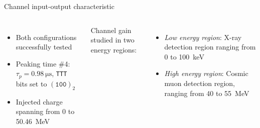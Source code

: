 \documentclass[aspectratio=169,xcolor=dvipsnames]{beamer}
\newcommand{\greencheck}{{\color{ForestGreen}\checkmark}}
\begin{document}
{\begin{frame}{Channel input-output characteristic}
\begin{columns}
            \vskip-0.2cm
            \begin{itemize}
                \item Both configurations successfully tested \greencheck
                \item Peaking time \#4: $\tau_{p} = \SI{0.98}{\micro\second}$, \texttt{TTT} bits set to $(\texttt{100})_{2}$
                \item Injected charge spanning from 0 to \SI{50.46}{\mega\electronvolt}
            \end{itemize}

            \vskip0.3cm
            Channel gain studied in two energy regions:
            \begin{itemize}
                \item \textit{Low energy region}: X-ray detection region ranging from 0 to \SI{100}{\kilo\electronvolt} \greencheck
                \item \textit{High energy region}: Cosmic muon detection region, ranging from 40 to \SI{55}{\mega\electronvolt} \greencheck
            \end{itemize}
            
    \end{columns}
\end{frame}
}
\end{document}
